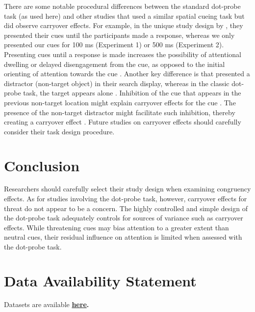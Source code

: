 \documentclass[issue,twocolumn,empirical, authordate,10pt]{jote-new-article}
\begin{document}
There are some notable procedural differences between the standard dot-probe task (as used here) and other studies that used a similar spatial cueing task but did observe carryover effects. For example, in the unique study design by \parencite{Gladwin2019b, Gladwin2020a}, they presented their cues until the participants made a response, whereas we only presented our cues for 100 ms (Experiment 1) or 500 ms (Experiment 2). Presenting cues until a response is made increases the possibility of attentional dwelling or delayed disengagement from the cue, as opposed to the initial orienting of attention towards the cue \parencite{Fox2001}. Another key difference is that \parencite{Gladwin2019b, Gladwin2020a} presented a distractor (non-target object) in their search display, whereas in the classic dot-probe task, the target appears alone \parencite{Mogg1998}. Inhibition of the cue that appears in the previous non-target location might explain carryover effects for the cue \parencite{Gladwin2020}. The presence of the non-target distractor might facilitate such inhibition, thereby creating a carryover effect \parencite{Gillich2019, vanMoorselaar2019}. Future studies on carryover effects should carefully consider their task design procedure.

\section{Conclusion}

Researchers should carefully select their study design when examining congruency effects. As for studies involving the dot-probe task, however, carryover effects for threat do not appear to be a concern. The highly controlled and simple design of the dot-probe task adequately controls for sources of variance such as carryover effects. While threatening cues may bias attention to a greater extent than neutral cues, their residual influence on attention is limited when assessed with the dot-probe task.



\section{Data Availability Statement}

Datasets are available \textbf{\href{https://osf.io/7qhsj/?view\_only=07b52294c1b647829644a833fc3d4883}{here}.}

\newpage

\printbibliography
\end{document}
